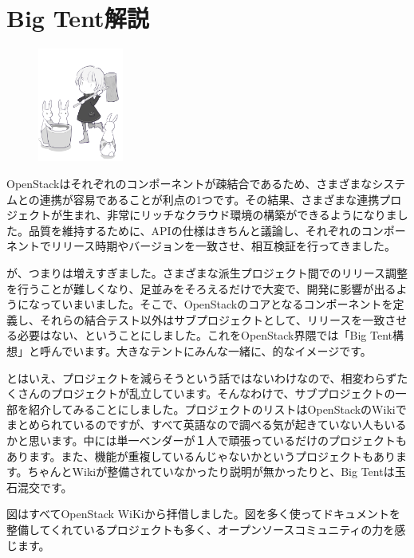 \chapter{Big Tent解説}

\begin{figure}
	\vspace*{-13\intextsep}
	\begin{center}
		\includegraphics[width=0.25\textwidth]{img/mochi.png}
	\end{center}
\end{figure}

OpenStackはそれぞれのコンポーネントが疎結合であるため、さまざまなシステムとの連携が容易であることが利点の1つです。その結果、さまざまな連携プロジェクトが生まれ、非常にリッチなクラウド環境の構築ができるようになりました。品質を維持するために、APIの仕様はきちんと議論し、それぞれのコンポーネントでリリース時期やバージョンを一致させ、相互検証を行ってきました。

が、つまりは増えすぎました。さまざまな派生プロジェクト間でのリリース調整を行うことが難しくなり、足並みをそろえるだけで大変で、開発に影響が出るようになっていまいました。そこで、OpenStackのコアとなるコンポーネントを定義し、それらの結合テスト以外はサブプロジェクトとして、リリースを一致させる必要はない、ということにしました。これをOpenStack界隈では「Big Tent構想」と呼んでいます。大きなテントにみんな一緒に、的なイメージです。

とはいえ、プロジェクトを減らそうという話ではないわけなので、相変わらずたくさんのプロジェクトが乱立しています。そんなわけで、サブプロジェクトの一部を紹介してみることにしました。プロジェクトのリストはOpenStackのWikiでまとめられているのですが、すべて英語なので調べる気が起きていない人もいるかと思います。中には単一ベンダーが１人で頑張っているだけのプロジェクトもあります。また、機能が重複しているんじゃないかというプロジェクトもあります。ちゃんとWikiが整備されていなかったり説明が無かったりと、Big Tentは玉石混交です。

図はすべてOpenStack WiKiから拝借しました。図を多く使ってドキュメントを整備してくれているプロジェクトも多く、オープンソースコミュニティの力を感じます。

